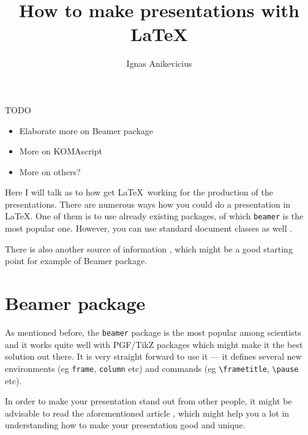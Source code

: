 

\usepackage[]{cite}
\usepackage{framed}

\title{How to make presentations with \LaTeX{}}
\author{Ignas Anikevicius}



\maketitle

\begin{framed}
\begin{center}
{\color{Red} TODO}
\begin{itemize}
    \item Elaborate more on Beamer package
    \item More on KOMAscript
    \item More on others?
\end{itemize}
\end{center}
\end{framed}

Here I will talk as to how get \LaTeX\ working for the production of the
presentations. There are numerous ways how you could do a presentation in
\LaTeX{}. One of
them is to use already existing packages, of which \verb|beamer| is the most
popular one. However, you can use standard document classes as well
\cite{PracTeX-komapres}.

There is also another source of information \cite{latexwikibook:presentations},
which might be a good starting point for example of Beamer package.

\section{Beamer package}

As mentioned before, the \verb|beamer| package is the most popular among
scientists and it works quite well with PGF/TikZ packages which might make it
the best solution out there. It is very straight forward to use it --- it
defines several new environments (eg \verb|frame|, \verb|column| etc) and
commands (eg \verb|\frametitle|, \verb|\pause| etc).

In order to make your presentation stand out from other people, it might be
advisable to read the aforementioned article \cite{PracTeX-komapres}, which
might help you a lot in understanding how to make your presentation good and
unique.

